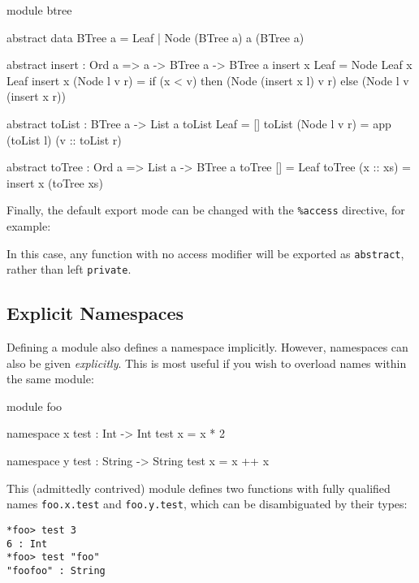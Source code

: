 \begin{code}[caption={Binary Tree module, with export modifiers}, label=bstmodp]
module btree

abstract data BTree a = Leaf
                      | Node (BTree a) a (BTree a)

abstract
insert : Ord a => a -> BTree a -> BTree a
insert x Leaf = Node Leaf x Leaf
insert x (Node l v r) = if (x < v) then (Node (insert x l) v r)
                                   else (Node l v (insert x r))

abstract
toList : BTree a -> List a
toList Leaf = []
toList (Node l v r) = app (toList l) (v :: toList r)

abstract
toTree : Ord a => List a -> BTree a
toTree [] = Leaf
toTree (x :: xs) = insert x (toTree xs)
\end{code}

\noindent
Finally, the default export mode can be changed with the \texttt{\%access} directive, for example:

\begin{code}
\end{code}

\noindent
In this case, any function with no access modifier will be exported as \texttt{abstract}, rather than left \texttt{private}.

\subsection{Explicit Namespaces}

Defining a module also defines a namespace implicitly.
However, namespaces can also be given \emph{explicitly}.
This is most useful if you wish to overload names within the same module:

\begin{code}
module foo

namespace x
  test : Int -> Int
  test x = x * 2

namespace y
  test : String -> String
  test x = x ++ x 
\end{code}

\noindent
This (admittedly contrived) module defines two functions with fully qualified names
\texttt{foo.x.test} and \texttt{foo.y.test}, which can be disambiguated by their types:

\begin{lstlisting}
*foo> test 3 
6 : Int
*foo> test "foo" 
"foofoo" : String
\end{lstlisting}

